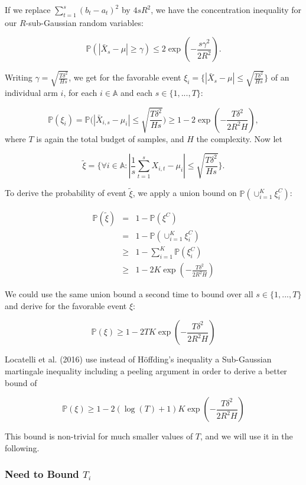 \documentclass[12pt,]{article}
\begin{document}
If we replace \(\sum_{t=1}^s(b_t - a_t)^2\) by \(4sR^2\), we have the
concentration inequality for our \(R\)-sub-Gaussian random variables:

\[
\mathbb{P}(|\bar{X}_s - \mu| \geq \gamma) \leq 2\exp (-\frac{s\gamma^2}{2R^2}).
\]

Writing \(\gamma = \sqrt{\frac{T\delta^2}{Hs}}\), we get for the
favorable event
\(\xi_i = \{|\bar{X}_s - \mu| \leq \sqrt{\frac{T\delta^2}{Hs}}\}\) of an
individual arm \(i\), for each \(i \in \mathbb{A}\) and each
\(s \in \{1, ..., T\}\):

\[
\mathbb{P}(\xi_i) = \mathbb{P}\Big(|\bar{X}_{i,s} - \mu_i| \leq \sqrt{\frac{T\delta^2}{Hs}}\Big) \geq 1 - 2\exp (-\frac{T\delta^2}{2R^2H}),
\] where \(T\) is again the total budget of samples, and \(H\) the
complexity. Now let

\[
\tilde{\xi} = \Big\{\forall i \in \mathbb{A}: |\frac{1}{s} \sum_{t=1}^{s}X_{i,t} - \mu_i| \leq \sqrt{\frac{T \delta^2}{H s}} \Big\}.
\]

To derive the probability of event \(\tilde{\xi}\), we apply a union
bound on \(\mathbb{P}(\cup_{i=1}^K \xi_i^C)\):

\begin{align*}
\mathbb{P}(\tilde{\xi}) & = & 1-\mathbb{P}(\xi^C) \\
& = & 1-\mathbb{P}(\cup_{i=1}^K \xi_i^C) \\
& \geq & 1 - \sum_{i=1}^K \mathbb{P}(\xi_i^C) \\
& \geq & 1 - 2K\exp (-\frac{T\delta^2}{2R^2H})
\end{align*}

We could use the same union bound a second time to bound over all
\(s \in \{1, ..., T\}\) and derive for the favorable event \(\xi\):

\[
\mathbb{P}(\xi) \geq 1 - 2TK \exp(-\frac{T\delta^2}{2R^2H})
\]

Locatelli et al. (2016) use instead of Höffding's inequality a
Sub-Gaussian martingale inequality including a peeling argument in order
to derive a better bound of

\[
\mathbb{P}(\xi) \geq 1 - 2(\log(T) +1)K \exp(-\frac{T\delta^2}{2R^2H})
\]

This bound is non-trivial for much smaller values of \(T\), and we will
use it in the following.

\subsubsection{\texorpdfstring{Need to Bound
\(T_i\)}{Need to Bound T\_i}}\label{need-to-bound-t_i}
\end{document}
